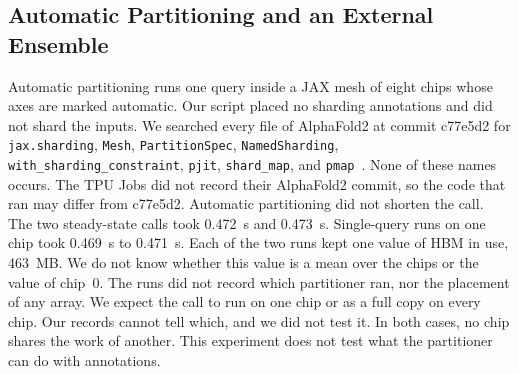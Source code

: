 \subsection{Automatic Partitioning and an External Ensemble}\label{sec:res-auto}
Automatic partitioning runs one query inside a JAX mesh of eight chips whose axes are marked automatic. Our script
placed no sharding annotations and did not shard the inputs.
We searched every file of AlphaFold2 at commit c77e5d2 for \texttt{jax.sharding}, \texttt{Mesh}, \texttt{PartitionSpec}, \texttt{NamedSharding}, \texttt{with\_sharding\_\allowbreak constraint}, \texttt{pjit}, \texttt{shard\_map}, and \texttt{pmap}~\cite{alphafoldrepo}. %
None of these names occurs. The TPU Jobs did not record their AlphaFold2 commit, so the code that ran may differ from
c77e5d2. Automatic partitioning did not
shorten the call.
The two steady-state calls took 0.472~s and 0.473~s. %
Single-query runs on one chip took 0.469~s to 0.471~s. %
Each of the two runs kept one value of HBM in use, 463~MB. %
We do not know whether this value is a mean over the chips or the value of chip~0. %
The runs did not record which partitioner ran, nor the placement of any array. We expect the call to run on one chip or as a full copy on every chip. Our records
cannot tell which, and we did not test it. In both cases, no chip shares the work of another. This experiment does not
test what the partitioner can do with annotations.

